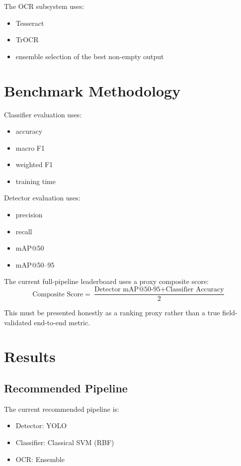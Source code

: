 \documentclass[12pt,a4paper]{article}
\begin{document}
The OCR subsystem uses:
\begin{itemize}
  \item Tesseract
  \item TrOCR
  \item ensemble selection of the best non-empty output
\end{itemize}

\section{Benchmark Methodology}

Classifier evaluation uses:
\begin{itemize}
  \item accuracy
  \item macro F1
  \item weighted F1
  \item training time
\end{itemize}

Detector evaluation uses:
\begin{itemize}
  \item precision
  \item recall
  \item mAP@50
  \item mAP@50--95
\end{itemize}

The current full-pipeline leaderboard uses a proxy composite score:
\[
\text{Composite Score} = \frac{\text{Detector mAP@50-95} + \text{Classifier Accuracy}}{2}
\]

This must be presented honestly as a ranking proxy rather than a true field-validated end-to-end metric.

\section{Results}

\subsection{Recommended Pipeline}

The current recommended pipeline is:
\begin{itemize}
  \item Detector: YOLO
  \item Classifier: Classical SVM (RBF)
  \item OCR: Ensemble
\end{itemize}
\end{document}
